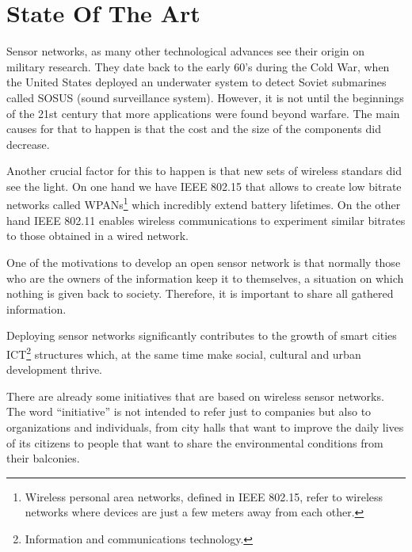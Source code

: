\chapter{State Of The Art} %

\label{Chapter2} %



Sensor networks, as many other technological advances see their origin on military research. They date back to the early 60's during the Cold War, when the United States deployed an underwater system to detect Soviet submarines called SOSUS (sound surveillance system). However, it is not until the beginnings of the 21st century that more applications were found beyond warfare. The main causes for that to happen is that the cost and the size of the components did decrease.

Another crucial factor for this to happen is that new sets of wireless standars did see the light. On one hand we have IEEE 802.15 that allows to create low bitrate networks called WPANs\footnote{Wireless personal area networks, defined in IEEE 802.15, refer to wireless networks where devices are just a few meters away from each other.} which incredibly extend battery lifetimes. On the other hand IEEE 802.11 enables wireless communications to experiment similar bitrates to those obtained in a wired network.

One of the motivations to develop an open sensor network is that normally those who are the owners of the information keep it to themselves, a situation on which nothing is given back to society. Therefore, it is important to share all gathered information.

Deploying sensor networks significantly contributes to the growth of smart cities ICT\footnote{Information and communications technology.} structures which, at the same time make social, cultural and urban development thrive\citep{caragliu2009smart}\citep{hollands2008will}.

There are already some initiatives that are based on wireless sensor networks. The word ``initiative'' is not intended to refer just to companies but also to organizations and individuals, from city halls that want to improve the daily lives of its citizens to people that want to share the environmental conditions from their balconies.

